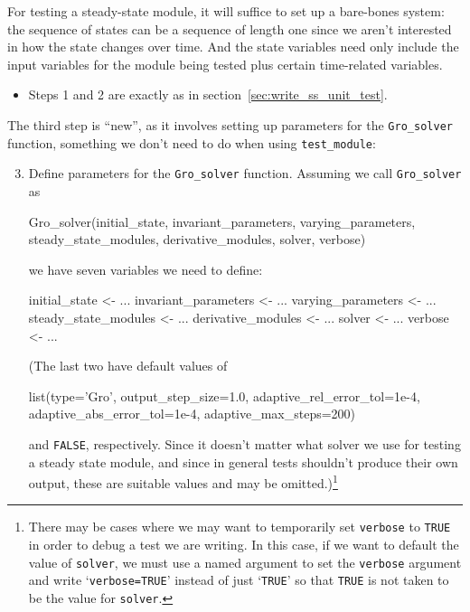 \documentclass{article}\usepackage[]{graphicx}\usepackage[]{color}
\newcommand{\Rcode}[1]{\lstinline[style=Rstyle]{#1}}
\begin{document}
\begin{appendices}
For testing a steady-state module, it will suffice to set up a
bare-bones system: the sequence of states can be a sequence of length
one since we aren't interested in how the state changes over time.
And the state variables need only include the input variables for the
module being tested plus certain time-related variables.

\begin{itemize}

\item[1 \& 2.] Steps 1 and 2 are exactly as in section~\ref{sec:write_ss_unit_test}.

\end{itemize}

The third step is ``new'', as it involves setting up parameters for
the \Rcode{Gro_solver} function, something we don't need to do when
using \Rcode{test_module}:

\begin{enumerate}
\setcounter{enumi}{2}

\item Define parameters for the \Rcode{Gro_solver} function.  Assuming
  we call \Rcode{Gro_solver} as
  \begin{Rlisting}[4]
    Gro_solver(initial_state, invariant_parameters, varying_parameters,
               steady_state_modules, derivative_modules, solver, verbose)
  \end{Rlisting}
  we have seven variables we need to define:
  \begin{Rlisting}[4]
    initial_state <- ...
    invariant_parameters <- ...
    varying_parameters <- ...
    steady_state_modules <- ...
    derivative_modules <- ...
    solver <- ...
    verbose <- ...
  \end{Rlisting}

  (The last two have default values of
  \begin{Rlisting}[4]
    list(type='Gro', output_step_size=1.0, adaptive_rel_error_tol=1e-4, adaptive_abs_error_tol=1e-4, adaptive_max_steps=200)
  \end{Rlisting}
  and \Rcode{FALSE}, respectively.  Since it doesn't matter what
  solver we use for testing a steady state module, and since in
  general tests shouldn't produce their own output, these are suitable
  values and may be omitted.)\footnote{
    There may be cases where we may want to temporarily set
    \Rcode{verbose} to \Rcode{TRUE} in order to debug a test we are
    writing.  In this case, if we want to default the value of
    \Rcode{solver}, we must use a named argument to set the
    \Rcode{verbose} argument and write `\Rcode{verbose=TRUE}' instead
    of just `\Rcode{TRUE}' so that \Rcode{TRUE} is not taken to be the
    value for \Rcode{solver}.}


\end{enumerate}
\end{appendices}
\end{document}
